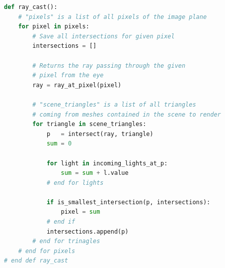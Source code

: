 \begin{minipage}{\linewidth}
\begin{lstlisting}[language=Python,caption={Eine abstrakte Umsetzung des Ray
        Casting
Verfahrens\protect\footnotemark.},label={fig:ray_casting:high_level},captionpos=b,emph={ray_cast}]
def ray_cast():
    # "pixels" is a list of all pixels of the image plane
    for pixel in pixels:
        # Save all intersections for given pixel
        intersections = []

        # Returns the ray passing through the given
        # pixel from the eye
        ray = ray_at_pixel(pixel)

        # "scene_triangles" is a list of all triangles
        # coming from meshes contained in the scene to render
        for triangle in scene_triangles:
            p   = intersect(ray, triangle)
            sum = 0

            for light in incoming_lights_at_p:
                sum = sum + l.value
            # end for lights

            if is_smallest_intersection(p, intersections):
                pixel = sum
            # end if
            intersections.append(p)
        # end for trinagles
    # end for pixels
# end def ray_cast
\end{lstlisting}
\end{minipage}
